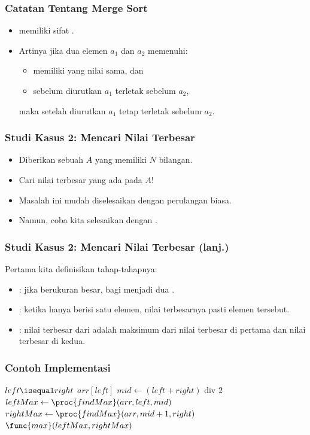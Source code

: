 \begin{frame}
\frametitle{Catatan Tentang Merge Sort}
\begin{itemize}
  \item \fMergeSort memiliki sifat .
  \item Artinya jika dua elemen $a_1$ dan $a_2$ memenuhi:
  \begin{itemize}
    \item memiliki yang nilai sama, dan
    \item sebelum diurutkan $a_1$ terletak sebelum $a_2$,
  \end{itemize}
  maka setelah diurutkan $a_1$ tetap terletak sebelum $a_2$.
\end{itemize}
\end{frame}

\begin{frame}
\frametitle{Studi Kasus 2: Mencari Nilai Terbesar}
\begin{itemize}
  \item Diberikan sebuah \farray $A$ yang memiliki $N$ bilangan.
  \item Cari nilai terbesar yang ada pada $A$!\newline
  \item Masalah ini mudah diselesaikan dengan perulangan biasa.
  \item Namun, coba kita selesaikan dengan \fdivideAndConquer.\end{itemize}
\end{frame}

\begin{frame}
\frametitle{Studi Kasus 2: Mencari Nilai Terbesar (lanj.)}
Pertama kita definisikan tahap-tahapnya:
\begin{itemize}
  \item {}: jika \farray berukuran besar, bagi menjadi dua \fsubarray.
  \item {}: ketika \farray hanya berisi satu elemen, nilai terbesarnya pasti elemen tersebut.
  \item {}: nilai terbesar dari \farray adalah maksimum dari nilai terbesar di \fsubarray pertama dan nilai terbesar di \fsubarray kedua.
\end{itemize}
\end{frame}

\begin{frame}
\frametitle{Contoh Implementasi}
\begin{codebox}
\li \If $left \isequal right$ \Then
\li   \Return $arr[left]$
\li \Else
\li   $mid \gets (left + right)$ div $2$
\li   $leftMax \gets \proc{findMax}(arr, left, mid)$
\li   $rightMax \gets \proc{findMax}(arr, mid+1, right)$
\li   \Return $\func{max}(leftMax, rightMax)$
    \End
\end{codebox}
\end{frame}

